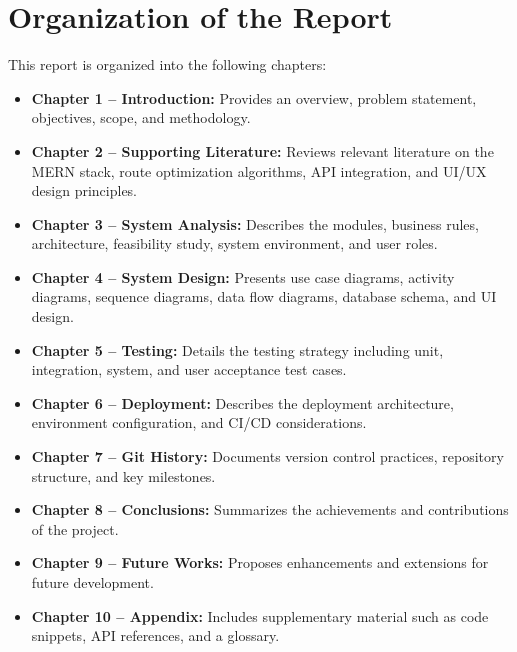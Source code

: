 \section{Organization of the Report}
This report is organized into the following chapters:
\begin{itemize}
    \item \textbf{Chapter 1 -- Introduction:} Provides an overview, problem statement, objectives, scope, and methodology.
    \item \textbf{Chapter 2 -- Supporting Literature:} Reviews relevant literature on the MERN stack, route optimization algorithms, API integration, and UI/UX design principles.
    \item \textbf{Chapter 3 -- System Analysis:} Describes the modules, business rules, architecture, feasibility study, system environment, and user roles.
    \item \textbf{Chapter 4 -- System Design:} Presents use case diagrams, activity diagrams, sequence diagrams, data flow diagrams, database schema, and UI design.
    \item \textbf{Chapter 5 -- Testing:} Details the testing strategy including unit, integration, system, and user acceptance test cases.
    \item \textbf{Chapter 6 -- Deployment:} Describes the deployment architecture, environment configuration, and CI/CD considerations.
    \item \textbf{Chapter 7 -- Git History:} Documents version control practices, repository structure, and key milestones.
    \item \textbf{Chapter 8 -- Conclusions:} Summarizes the achievements and contributions of the project.
    \item \textbf{Chapter 9 -- Future Works:} Proposes enhancements and extensions for future development.
    \item \textbf{Chapter 10 -- Appendix:} Includes supplementary material such as code snippets, API references, and a glossary.
\end{itemize}
